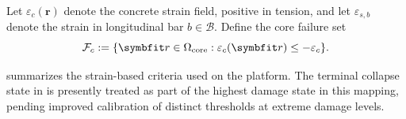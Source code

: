Let \(\varepsilon_c(\bm r)\) denote the concrete strain field, positive in tension, and let
\(\varepsilon_{s,b}\) denote the strain in longitudinal bar \(b\in\mathcal B\).
Define the core failure set
\[
\mathcal F_c
:=
\{\bm r\in\SectionCore : \varepsilon_c(\bm r)\le -\StrainCoreCrush\}.
\]
\fi 




 summarizes the strain-based criteria used on the \gls{platform}. 
The terminal collapse state in \citet{zhou2022capacitya} is presently treated as part of the highest damage state in this mapping, pending improved calibration of distinct thresholds at extreme damage levels.

\newcommand{\StrainCoverCrack}{\varepsilon_{r}} %
\newcommand{\StrainCoverCrush}{\varepsilon_{s}} %
\newcommand{\StrainCoreCrush}{\varepsilon_{c}} %
\newcommand{\StrainSteelPeak}{\varepsilon_{u}} %

